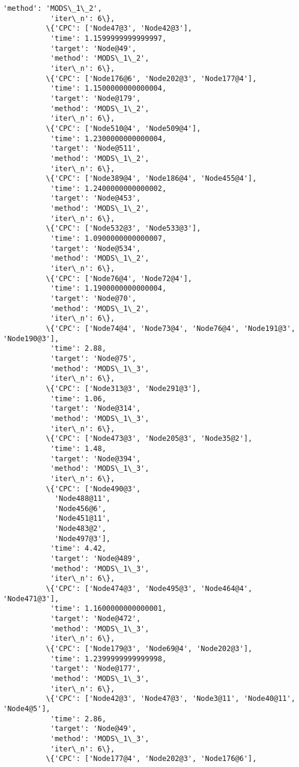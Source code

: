 \documentclass[11pt]{article}
\begin{document}
\begin{Verbatim}[commandchars=\\\{\}]
           'method': 'MODS\_1\_2',
           'iter\_n': 6\},
          \{'CPC': ['Node47@3', 'Node42@3'],
           'time': 1.1599999999999997,
           'target': 'Node@49',
           'method': 'MODS\_1\_2',
           'iter\_n': 6\},
          \{'CPC': ['Node176@6', 'Node202@3', 'Node177@4'],
           'time': 1.1500000000000004,
           'target': 'Node@179',
           'method': 'MODS\_1\_2',
           'iter\_n': 6\},
          \{'CPC': ['Node510@4', 'Node509@4'],
           'time': 1.2300000000000004,
           'target': 'Node@511',
           'method': 'MODS\_1\_2',
           'iter\_n': 6\},
          \{'CPC': ['Node389@4', 'Node186@4', 'Node455@4'],
           'time': 1.2400000000000002,
           'target': 'Node@453',
           'method': 'MODS\_1\_2',
           'iter\_n': 6\},
          \{'CPC': ['Node532@3', 'Node533@3'],
           'time': 1.0900000000000007,
           'target': 'Node@534',
           'method': 'MODS\_1\_2',
           'iter\_n': 6\},
          \{'CPC': ['Node76@4', 'Node72@4'],
           'time': 1.1900000000000004,
           'target': 'Node@70',
           'method': 'MODS\_1\_2',
           'iter\_n': 6\},
          \{'CPC': ['Node74@4', 'Node73@4', 'Node76@4', 'Node191@3', 'Node190@3'],
           'time': 2.88,
           'target': 'Node@75',
           'method': 'MODS\_1\_3',
           'iter\_n': 6\},
          \{'CPC': ['Node313@3', 'Node291@3'],
           'time': 1.06,
           'target': 'Node@314',
           'method': 'MODS\_1\_3',
           'iter\_n': 6\},
          \{'CPC': ['Node473@3', 'Node205@3', 'Node35@2'],
           'time': 1.48,
           'target': 'Node@394',
           'method': 'MODS\_1\_3',
           'iter\_n': 6\},
          \{'CPC': ['Node490@3',
            'Node488@11',
            'Node456@6',
            'Node451@11',
            'Node483@2',
            'Node497@3'],
           'time': 4.42,
           'target': 'Node@489',
           'method': 'MODS\_1\_3',
           'iter\_n': 6\},
          \{'CPC': ['Node474@3', 'Node495@3', 'Node464@4', 'Node471@3'],
           'time': 1.1600000000000001,
           'target': 'Node@472',
           'method': 'MODS\_1\_3',
           'iter\_n': 6\},
          \{'CPC': ['Node179@3', 'Node69@4', 'Node202@3'],
           'time': 1.2399999999999998,
           'target': 'Node@177',
           'method': 'MODS\_1\_3',
           'iter\_n': 6\},
          \{'CPC': ['Node42@3', 'Node47@3', 'Node3@11', 'Node40@11', 'Node4@5'],
           'time': 2.86,
           'target': 'Node@49',
           'method': 'MODS\_1\_3',
           'iter\_n': 6\},
          \{'CPC': ['Node177@4', 'Node202@3', 'Node176@6'],

\end{Verbatim}
\end{document}
